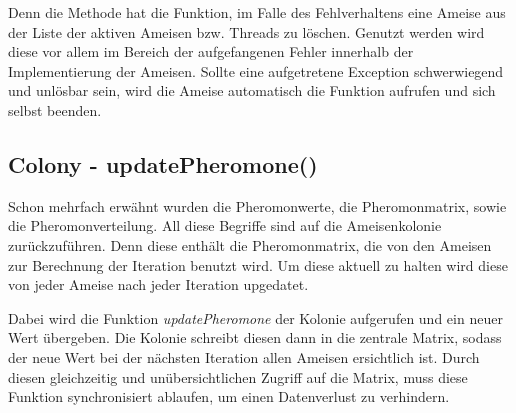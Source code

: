{	Denn die Methode hat die Funktion, im Falle des Fehlverhaltens eine Ameise aus der Liste der aktiven Ameisen bzw. Threads zu löschen. Genutzt werden wird diese vor allem im Bereich der aufgefangenen Fehler innerhalb der Implementierung der Ameisen. Sollte eine aufgetretene Exception schwerwiegend und unlösbar sein, wird die Ameise automatisch die Funktion aufrufen und sich selbst beenden.
	
	\subsection{Colony - updatePheromone()}
	Schon mehrfach erwähnt wurden die Pheromonwerte, die Pheromonmatrix, sowie die Pheromonverteilung. All diese Begriffe sind auf die Ameisenkolonie zurückzuführen. Denn diese enthält die Pheromonmatrix, die von den Ameisen zur Berechnung der Iteration benutzt wird. Um diese aktuell zu halten wird diese von jeder Ameise nach jeder Iteration upgedatet. 
	
	Dabei wird die Funktion \textit{updatePheromone} der Kolonie aufgerufen und ein neuer Wert übergeben. Die Kolonie schreibt diesen dann in die zentrale Matrix, sodass der neue Wert bei der nächsten Iteration allen Ameisen ersichtlich ist. Durch diesen gleichzeitig und unübersichtlichen Zugriff auf die Matrix, muss diese Funktion synchronisiert ablaufen, um einen Datenverlust zu verhindern.
	
}